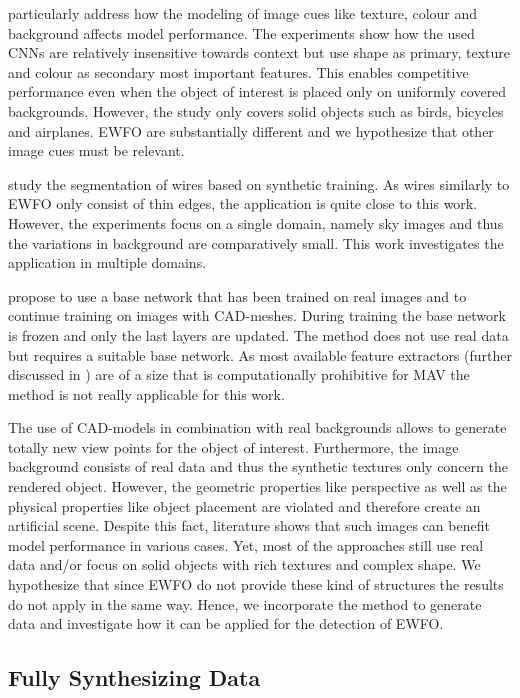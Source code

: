 \citeauthor{Peng}\cite{Peng} particularly address how the modeling of image cues like texture, colour and background affects model performance. The experiments show how the used \acp{CNN} are relatively insensitive towards context but use shape as primary, texture and colour as secondary most important features. This enables competitive performance even when the object of interest is placed only on uniformly covered backgrounds. However, the study only covers solid objects such as birds, bicycles and airplanes. \ac{EWFO} are substantially different and we hypothesize that other image cues must be relevant.

\citeauthor{Madaan2017}\cite{Madaan2017} study the segmentation of wires based on synthetic training. As wires similarly to \ac{EWFO} only consist of thin edges, the application is quite close to this work. However, the experiments focus on a single domain, namely sky images and thus the variations in background are comparatively small. This work investigates the application in multiple domains.

\citeauthor{Hinterstoisser2017} \cite{Hinterstoisser2017} propose to use a base network that has been trained on real images and to continue training on images with CAD-meshes. During training the base network is frozen and only the last layers are updated. The method does not use real data but requires a suitable base network. As most available feature extractors (further discussed in ) are of a size that is computationally prohibitive for \ac{MAV} the method is not really applicable for this work. 

The use of CAD-models in combination with real backgrounds allows to generate totally new view points for the object of interest. Furthermore, the image background consists of real data and thus the synthetic textures only concern the rendered object. However, the geometric properties like perspective as well as the physical properties like object placement are violated and therefore create an artificial scene. Despite this fact, literature shows that such images can benefit model performance in various cases. Yet, most of the approaches still use real data and/or focus on solid objects with rich textures and complex shape. We hypothesize that since \ac{EWFO} do not provide these kind of structures the results do not apply in the same way. Hence, we incorporate the method to generate data and investigate how it can be applied for the detection of \ac{EWFO}.

\subsection{Fully Synthesizing Data}

